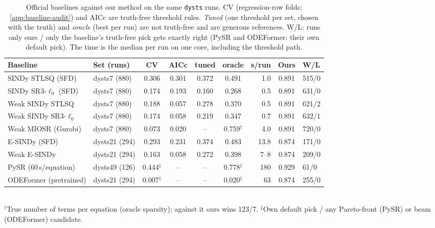\begin{table}[t]
\centering
\caption{Official baselines against our method on the same \texttt{dysts} runs. CV (regression-row folds; \cref{app:baseline-audit}) and AICc are truth-free threshold rules. \emph{Tuned} (one threshold per set, chosen with the truth) and \emph{oracle} (best per run) are not truth-free and are generous references. W/L: runs only ours / only the baseline's truth-free pick gets exactly right (PySR and ODEFormer: their own default pick). The time is the median per run on one core, including the threshold path.}
\label{tab:baselines}
\small
\begin{tabular}{@{}llccccrcl@{}}
\toprule
Baseline & Set (runs) & CV & AICc & tuned & oracle & s/run & Ours & W/L \\
\midrule
SINDy STLSQ (SFD) & dysts7 (880) & 0.306 & 0.301 & 0.372 & 0.491 & 1.0 & 0.891 & 515/0 \\
SINDy SR3-$\ell_0$ (SFD) & dysts7 (880) & 0.174 & 0.193 & 0.160 & 0.268 & 0.5 & 0.891 & 631/0 \\
Weak SINDy STLSQ & dysts7 (880) & 0.188 & 0.057 & 0.278 & 0.370 & 0.5 & 0.891 & 621/2 \\
Weak SINDy SR3-$\ell_0$ & dysts7 (880) & 0.174 & 0.058 & 0.219 & 0.347 & 0.7 & 0.891 & 632/1 \\
Weak MIOSR (Gurobi) & dysts7 (880) & 0.073 & 0.020 & -- & 0.759$^\dagger$ & 4.0 & 0.891 & 720/0 \\
E-SINDy (SFD) & dysts21 (294) & 0.293 & 0.231 & 0.374 & 0.483 & 13.8 & 0.874 & 171/0 \\
Weak E-SINDy & dysts21 (294) & 0.163 & 0.058 & 0.272 & 0.398 & 7--8 & 0.874 & 209/0 \\
PySR (60\,s/equation) & dysts49 (126) & 0.444$^\ddagger$ & -- & -- & 0.778$^\ddagger$ & 180 & 0.929 & 61/0 \\
ODEFormer (pretrained) & dysts21 (294) & 0.007$^\ddagger$ & -- & -- & 0.020$^\ddagger$ & 63 & 0.874 & 255/0 \\
\bottomrule
\end{tabular}
\\[2pt]{\footnotesize $^\dagger$True number of terms per equation (oracle sparsity); against it ours wins 123/7. $^\ddagger$Own default pick / any Pareto-front (PySR) or beam (ODEFormer) candidate.}
\end{table}

